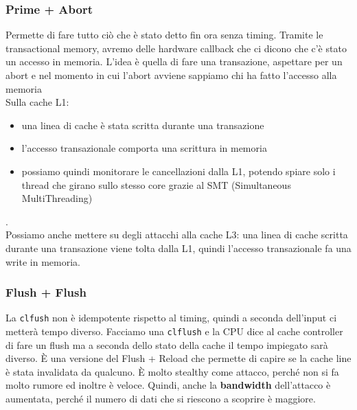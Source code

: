 \documentclass[12pt, oneside]{extbook} %
\begin{document}
\subsubsection{Prime + Abort}
Permette di fare tutto ciò che è stato detto fin ora senza timing. Tramite le transactional memory, avremo delle hardware callback che ci dicono che c'è stato un accesso in memoria. L'idea è quella di fare una transazione, aspettare per un abort e nel momento in cui l'abort avviene sappiamo chi ha fatto l'accesso alla memoria\\Sulla cache L1:
\begin{itemize}
	\item una linea di cache è stata scritta durante una transazione
	\item l'accesso transazionale comporta una scrittura in memoria
	\item possiamo quindi monitorare le cancellazioni dalla L1, potendo spiare solo i thread che girano sullo stesso core grazie al SMT (Simultaneous MultiThreading)
\end{itemize}.\\ Possiamo anche mettere su degli attacchi alla cache L3: una linea di cache scritta durante una transazione viene tolta dalla L1, quindi l'accesso transazionale fa una write in memoria.
\subsubsection{Flush + Flush}
La \texttt{clfush} non è idempotente rispetto al timing, quindi a seconda dell'input ci metterà tempo diverso. Facciamo una \texttt{clflush} e la CPU dice al cache controller di fare un flush ma a seconda dello stato della cache il tempo impiegato sarà diverso. È una versione del Flush + Reload che permette di capire se la cache line è stata invalidata da qualcuno. È molto stealthy come attacco, perché non si fa molto rumore ed inoltre è veloce. Quindi, anche la \textbf{bandwidth} dell'attacco è aumentata, perché il numero di dati che si riescono a scoprire è maggiore.
\end{document}
